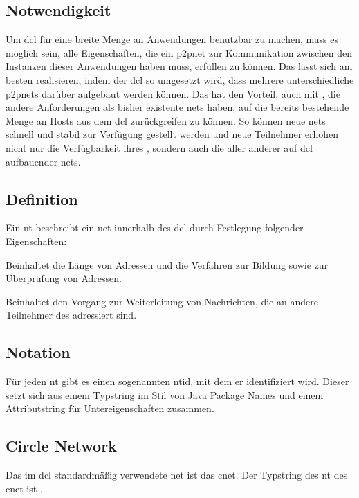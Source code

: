 
\subsection{Notwendigkeit}
Um \gls{dcl} für eine breite Menge an Anwendungen benutzbar zu machen, muss es möglich sein, alle
Eigenschaften, die ein \gls{p2pnet} zur Kommunikation zwischen den Instanzen dieser Anwendungen
haben muss, erfüllen zu können. Das lässt sich am besten realisieren, indem der \gls{dcl} so umgesetzt
wird, dass mehrere unterschiedliche \glspl{p2pnet} darüber aufgebaut werden können.
Das hat den Vorteil, auch mit , die andere Anforderungen
als bisher existente \glspl{net} haben, auf die bereits bestehende Menge an Hosts aus dem \gls{dcl}
zurückgreifen zu können. So können neue \glspl{net} schnell und stabil zur Verfügung gestellt werden
und neue Teilnehmer erhöhen nicht nur die Verfügbarkeit ihres , sondern auch
die aller anderer auf \gls{dcl} aufbauender \glspl{net}.

\subsection{Definition}
Ein \gls{nt} beschreibt ein \gls{net} innerhalb des \gls{dcl} durch Festlegung folgender Eigenschaften:

\begin{description}

		Beinhaltet die Länge von Adressen und die Verfahren zur Bildung sowie zur Überprüfung
		von Adressen.

		Beinhaltet den Vorgang zur Weiterleitung von Nachrichten, die an andere Teilnehmer des
		 adressiert sind.

\end{description}

\subsection{Notation}
Für jeden \gls{nt} gibt es einen sogenannten \gls{ntid}, mit dem er identifiziert wird.
Dieser setzt sich aus einem Typstring im Stil von Java Package Names und einem Attributstring für
Untereigenschaften zusammen.

\subsection{Circle Network}
Das im \gls{dcl} standardmäßig verwendete \gls{net} ist das \gls{cnet}. Der Typstring des \gls{nt} des
\gls{cnet} ist \code{\cnettype}.

